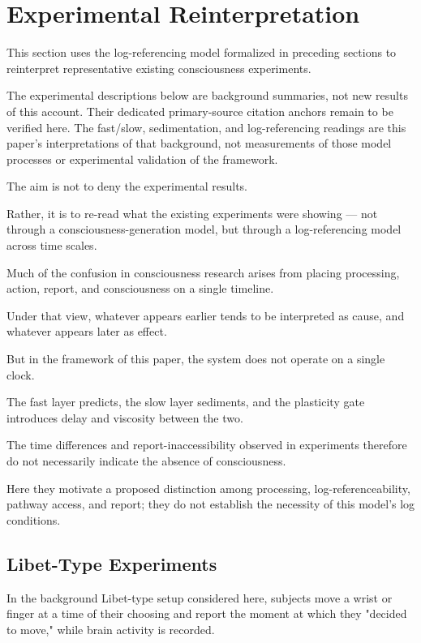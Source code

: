 \section{Experimental Reinterpretation}


This section uses the log-referencing model formalized in preceding sections to reinterpret representative existing consciousness experiments.

The experimental descriptions below are background summaries, not new results of this account. Their dedicated primary-source citation anchors remain to be verified here. The fast/slow, sedimentation, and log-referencing readings are this paper's interpretations of that background, not measurements of those model processes or experimental validation of the framework.

The aim is not to deny the experimental results.

Rather, it is to re-read what the existing experiments were showing — not through a consciousness-generation model, but through a log-referencing model across time scales.

Much of the confusion in consciousness research arises from placing processing, action, report, and consciousness on a single timeline.

Under that view, whatever appears earlier tends to be interpreted as cause, and whatever appears later as effect.

But in the framework of this paper, the system does not operate on a single clock.

The fast layer predicts, the slow layer sediments, and the plasticity gate introduces delay and viscosity between the two.

The time differences and report-inaccessibility observed in experiments therefore do not necessarily indicate the absence of consciousness.

Here they motivate a proposed distinction among processing, log-referenceability, pathway access, and report; they do not establish the necessity of this model's log conditions.

\subsection{Libet-Type Experiments}


In the background Libet-type setup considered here, subjects move a wrist or finger at a time of their choosing and report the moment at which they "decided to move," while brain activity is recorded.

